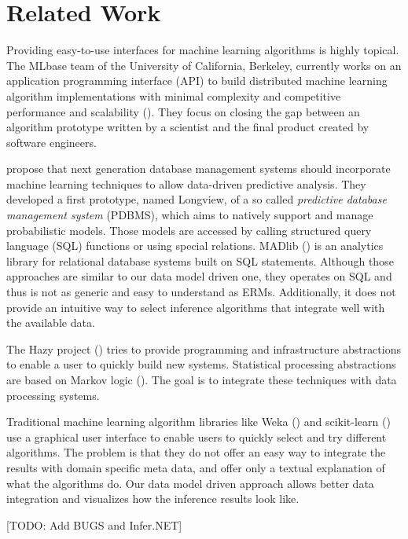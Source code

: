\section{Related Work}

Providing easy-to-use interfaces for machine learning algorithms is highly topical. The MLbase team of the University of California, Berkeley, currently works on an application programming interface (API) to build distributed machine learning algorithm implementations with minimal complexity and competitive performance and scalability (\cite{sparks2013mli}). They focus on closing the gap between an algorithm prototype written by a scientist and the final product created by software engineers.

\textcite{akdere2011case} propose that next generation database management systems should incorporate machine learning techniques to allow data-driven predictive analysis. They developed a first prototype, named Longview, of a so called \emph{predictive database management system} (PDBMS), which aims to natively support and manage probabilistic models. Those models are accessed by calling structured query language (SQL) functions or using special relations. MADlib (\cite{hellerstein2012madlib}) is an analytics library for relational database systems built on SQL statements. Although those approaches are similar to our data model driven one, they operates on SQL and thus is not as generic and easy to understand as ERMs. Additionally, it does not provide an intuitive way to select inference algorithms that integrate well with the available data.

The Hazy project (\cite{kumar2013hazy}) tries to provide programming and infrastructure abstractions to enable a user to quickly build new systems. Statistical processing abstractions are based on Markov logic (\cite{domingos2007markov}). The goal is to integrate these techniques with data processing systems.

Traditional machine learning algorithm libraries like Weka (\cite{hall2009weka}) and scikit-learn (\cite{scikit-learn}) use a graphical user interface to enable users to quickly select and try different algorithms. The problem is that they do not offer an easy way to integrate the results with domain specific meta data, and offer only a textual explanation of what the algorithms do. Our data model driven approach allows better data integration and visualizes how the inference results look like.

[TODO: Add BUGS and Infer.NET]

